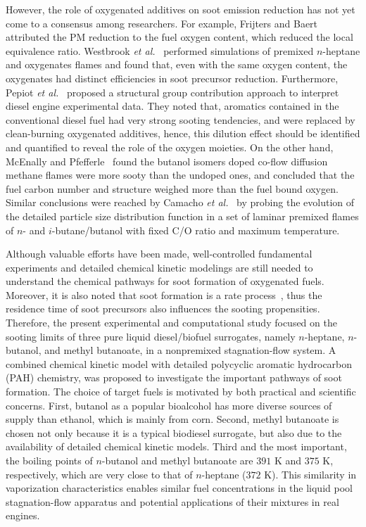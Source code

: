 \documentclass[review,3p,times]{elsarticleUS}
\begin{document}
However, the role of oxygenated additives on soot emission reduction has not yet come to a consensus among researchers. For example, Frijters and Baert~\cite{frijters06} attributed the PM reduction to the fuel oxygen content, which reduced the local equivalence ratio. Westbrook \emph{et al.}~\cite{westbrook06} performed simulations of premixed $n$-heptane and oxygenates flames and found that, even with the same oxygen content, the oxygenates had distinct efficiencies in soot precursor reduction. Furthermore, Pepiot \emph{et al.}~\cite{desjardins08} proposed a structural group contribution approach to interpret diesel engine experimental data. They noted that, aromatics contained in the conventional diesel fuel had very strong sooting tendencies, and were replaced by clean-burning oxygenated additives, hence, this dilution effect should be identified and quantified to reveal the role of the oxygen moieties. On the other hand, McEnally and Pfefferle~\cite{mcenally05,mcenally11} found the butanol isomers doped co-flow diffusion methane flames were more sooty than the undoped ones, and concluded that the fuel  carbon number and structure weighed more than the fuel bound oxygen. Similar conclusions were reached by Camacho \emph{et al.}~\cite{camacho13} by probing the evolution of the detailed particle size distribution function in a set of laminar premixed flames of $n$- and $i$-butane/butanol with fixed C/O ratio and maximum temperature. 

Although valuable efforts have been made, well-controlled fundamental experiments and detailed chemical kinetic modelings are still needed to understand the chemical pathways for soot formation of oxygenated fuels. Moreover, it is also noted that soot formation is a rate process~\cite{vandsburger85}, thus the residence time of soot precursors also influences the sooting propensities\cite{tsuji71}. Therefore, the present experimental and computational study focused on the sooting limits of three pure liquid diesel/biofuel surrogates, namely $n$-heptane, $n$-butanol, and methyl butanoate, in a nonpremixed stagnation-flow system. A combined chemical kinetic model with detailed polycyclic aromatic hydrocarbon (PAH) chemistry, was proposed to investigate the important pathways of soot formation. The choice of target fuels is motivated by both practical and scientific concerns. First, butanol as a popular bioalcohol has more diverse sources of supply than ethanol, which is mainly from corn. Second, methyl butanoate is chosen not only because it is a typical biodiesel surrogate, but also due to the availability of detailed chemical kinetic models. Third and the most important, the boiling points of $n$-butanol and methyl butanoate are $391$ K and $375$ K, respectively, which are very close to that of $n$-heptane ($372$ K). This similarity in vaporization characteristics enables similar fuel concentrations in the liquid pool stagnation-flow apparatus and potential applications of their mixtures in real engines.
\end{document}
